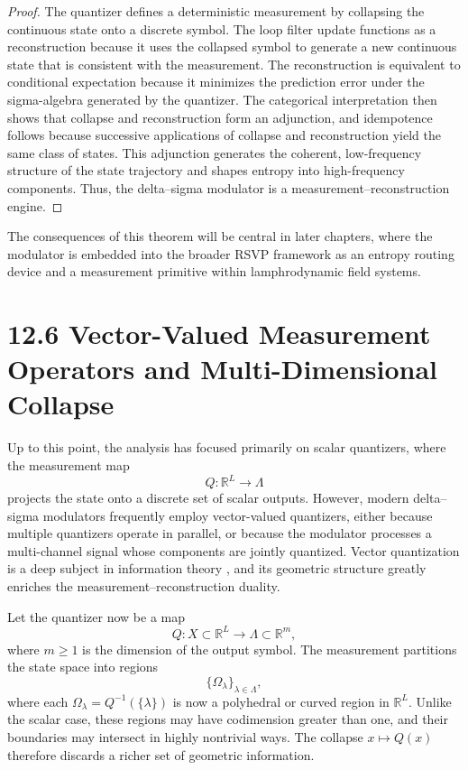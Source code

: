 \begin{proof}
The quantizer defines a deterministic measurement by collapsing the continuous state onto a discrete symbol. The loop filter update functions as a reconstruction because it uses the collapsed symbol to generate a new continuous state that is consistent with the measurement. The reconstruction is equivalent to conditional expectation because it minimizes the prediction error under the sigma-algebra generated by the quantizer. The categorical interpretation then shows that collapse and reconstruction form an adjunction, and idempotence follows because successive applications of collapse and reconstruction yield the same class of states. This adjunction generates the coherent, low-frequency structure of the state trajectory and shapes entropy into high-frequency components. Thus, the delta--sigma modulator is a measurement--reconstruction engine.
\end{proof}

The consequences of this theorem will be central in later chapters, where the modulator is embedded into the broader RSVP framework as an entropy routing device and a measurement primitive within lamphrodynamic field systems.

\section*{12.6 Vector-Valued Measurement Operators and Multi-Dimensional Collapse}

Up to this point, the analysis has focused primarily on scalar quantizers, where the measurement map
\[
Q : \mathbb{R}^{L} \to \Lambda
\]
projects the state onto a discrete set of scalar outputs. However, modern delta--sigma modulators frequently employ vector-valued quantizers, either because multiple quantizers operate in parallel, or because the modulator processes a multi-channel signal whose components are jointly quantized. Vector quantization is a deep subject in information theory \cite{gersho1991vector}, and its geometric structure greatly enriches the measurement--reconstruction duality.

Let the quantizer now be a map
\[
Q : X \subset \mathbb{R}^{L} \longrightarrow \Lambda \subset \mathbb{R}^{m},
\]
where $m \geq 1$ is the dimension of the output symbol. The measurement partitions the state space into regions
\[
\{\Omega_{\lambda}\}_{\lambda \in \Lambda},
\]
where each $\Omega_{\lambda} = Q^{-1}(\{\lambda\})$ is now a polyhedral or curved region in $\mathbb{R}^{L}$. Unlike the scalar case, these regions may have codimension greater than one, and their boundaries may intersect in highly nontrivial ways. The collapse $x \mapsto Q(x)$ therefore discards a richer set of geometric information.


